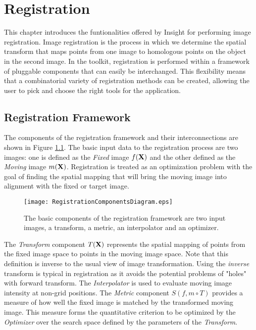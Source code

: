 \chapter{Registration}

This chapter introduces the funtionalities offered by Insight for performing
image registration. Image registration is the process in which we determine
the spatial transform that maps points from one image to homologous points
on the object in the second image. In the toolkit, registration is performed 
within a framework of pluggable components that can easily be interchanged. 
This flexibility means that a combinatorial variety of registration methods can
be created, allowing the user to pick and choose the right tools for 
the application.

\section{Registration Framework}
The components of the registration framework and their interconnections 
are shown in Figure \ref{fig:RegistrationComponents}. The basic
input data to the registration process are two images: one
is defined as the \emph{Fixed} image $f(\bf{X})$ and the other defined as the
\emph{Moving} image $m(\bf{X})$. Registration is treated as an optimization problem
with the goal of finding the spatial mapping that will bring the moving image into 
alignment with the fixed or target image.

\begin{figure}
\center
\texttt{[image: RegistrationComponentsDiagram.eps]}
\caption{The basic components of the registration framework are two input images,
a transform, a metric, an interpolator and an optimizer.}
\label{fig:RegistrationComponents}
\end{figure}

The \emph{Transform} component $T(\bf{X})$ represents the spatial mapping of points 
from the fixed image space to points in the moving image space. Note that this 
definition is inverse to the usual view of image transformation. Using the
\emph{inverse} transform is typical in registration as it avoids the potential
problems of "holes" with forward transform. The \emph{Interpolator} is used to
evaluate moving image intensity at non-grid positions. The \emph{Metric} component
$S(f,m \circ T)$ provides a measure of how well the fixed image is matched by 
the transformed moving image. This measure forms the quantitative criterion to be optimized 
by the \emph{Optimizer} over the search space defined by the parameters of the 
\emph{Transform}.


